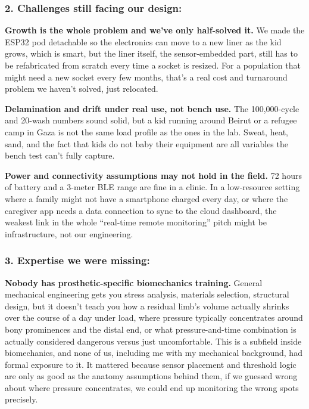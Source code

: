 \subsubsection*{2. Challenges still facing our design:}

\textbf{Growth is the whole problem and we've only half-solved it.} We made the ESP32 pod detachable so the electronics can move to a new liner as the kid grows, which is smart, but the liner itself, the sensor-embedded part, still has to be refabricated from scratch every time a socket is resized. For a population that might need a new socket every few months, that's a real cost and turnaround problem we haven't solved, just relocated.

\textbf{Delamination and drift under real use, not bench use.} The 100,000-cycle and 20-wash numbers sound solid, but a kid running around Beirut or a refugee camp in Gaza is not the same load profile as the ones in the lab. Sweat, heat, sand, and the fact that kids do not baby their equipment are all variables the bench test can't fully capture.

\textbf{Power and connectivity assumptions may not hold in the field.} 72 hours of battery and a 3-meter BLE range are fine in a clinic. In a low-resource setting where a family might not have a smartphone charged every day, or where the caregiver app needs a data connection to sync to the cloud dashboard, the weakest link in the whole “real-time remote monitoring” pitch might be infrastructure, not our engineering.

\subsubsection*{3. Expertise we were missing:}

\textbf{Nobody has prosthetic-specific biomechanics training.} General mechanical engineering gets you stress analysis, materials selection, structural design, but it doesn't teach you how a residual limb's volume actually shrinks over the course of a day under load, where pressure typically concentrates around bony prominences and the distal end, or what pressure-and-time combination is actually considered dangerous versus just uncomfortable. This is a subfield inside biomechanics, and none of us, including me with my mechanical background, had formal exposure to it. It mattered because sensor placement and threshold logic are only as good as the anatomy assumptions behind them, if we guessed wrong about where pressure concentrates, we could end up monitoring the wrong spots precisely.

